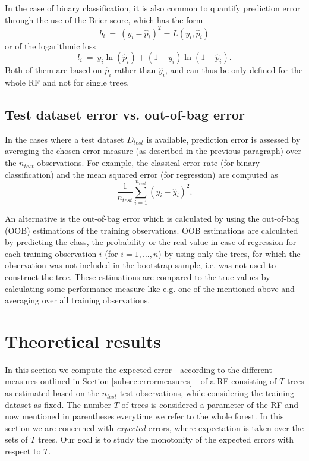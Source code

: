 \documentclass[paper=a4
               ,12pt
               ,DIV=12
               ,parskip=half
               ,titlepage=on
               ,headinclude 
               ,footinclude
               ,headsepline
               ,footsepline         %
               ,ilines 
               ]{scrartcl}
\begin{document}
In the case of binary classification, it is also common to quantify prediction error through the use of the Brier score, which has the form
\[
b_i\ =\ (y_i-\hat{p}_i)^2=L(y_i,\hat{p}_i)
\]
or of the logarithmic loss
\[
l_i\ =\ y_i\ln(\hat{p}_i)+(1-y_i)\ln (1-\hat{p}_i).
\]
Both of them are based on $\hat{p}_i$ rather than $\hat{y}_i$, and can thus be only defined for the whole RF and not for single trees.

\subsection{Test dataset error vs. out-of-bag error}
In the cases where a test dataset $D_{test}$ is available, prediction error is assessed by averaging the chosen error measure (as described in the previous paragraph) over the $n_{test}$ observations.
For example, the classical error rate (for binary classification) and the mean squared error (for regression) are computed as
\[
\frac{1}{n_{test}}\sum_{i=1}^{n_{test}}(y_i-\hat{y}_i)^2.
\]

An alternative is the out-of-bag error which is calculated by using the out-of-bag (OOB) estimations of the training observations. OOB estimations are calculated by predicting the class, 
the probability or the real value in case of regression for each training observation $i$ (for $i=1,\dots,n$) by using only the trees, for which the observation was not included in the bootstrap sample, i.e. was not used to construct the tree. 
These estimations are compared to the true values by calculating some performance measure like e.g. one of the mentioned above and averaging over all training observations. 





\section{Theoretical results}
\label{sec:theory}
In this section we compute the expected error---according to the different measures outlined in Section \ref{subsec:errormeasures}---of a RF consisting of $T$ trees as estimated based on the $n_{test}$ test observations, 
while considering the training dataset as fixed. The number $T$ of trees is considered a parameter of the RF and now mentioned in parentheses everytime we refer to the whole forest. In this section we are concerned with 
\textit{expected} errors, where expectation is taken over the sets of $T$ trees. Our goal is to study the monotonity of the expected errors with respect to $T$.
\end{document}
